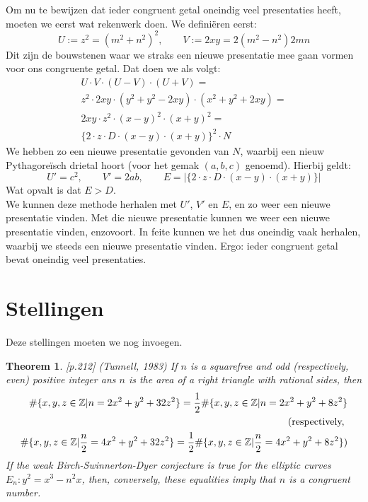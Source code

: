 \documentclass[12pt,reqno]{article}
\newcommand*{\ZZ}{\ensuremath{\mathbb{Z}}}
\begin{document}
	Om nu te bewijzen dat ieder congruent getal oneindig veel presentaties heeft, moeten we eerst wat rekenwerk doen. We defini\"eren eerst:
	\begin{equation}
		U:= z^2=(m^2+n^2)^2, \qquad V:= 2xy=2(m^2-n^2)2mn
	\end{equation}
	Dit zijn de bouwstenen waar we straks een nieuwe presentatie mee gaan vormen voor ons congruente getal. Dat doen we als volgt:
	\begin{align}
			U\cdot V \cdot (U-V) \cdot (U+V)=\\
			z^2\cdot 2xy\cdot (y^2+y^2-2xy)\cdot (x^2+y^2+2xy)=\\
			2xy\cdot z^2\cdot (x-y)^2\cdot (x+y)^2=\\
			\{2\cdot z\cdot D\cdot (x-y)\cdot (x+y)\}^2\cdot N
	\end{align}
	We hebben zo een nieuwe presentatie gevonden van $N$, waarbij een nieuw Pythagore\"isch drietal hoort (voor het gemak $(a,b,c)$ genoemd). Hierbij geldt:
	\begin{equation}
		U'=c^2, \qquad V'=2ab, \qquad E=|\{2\cdot z\cdot D\cdot (x-y)\cdot (x+y)\}|
	\end{equation}
	Wat opvalt is dat $E>D$.\\
	
	We kunnen deze methode herhalen met $U'$, $V'$ en $E$, en zo weer een nieuwe presentatie vinden. Met die nieuwe presentatie kunnen we weer een nieuwe presentatie vinden, enzovoort. In feite kunnen we het dus oneindig vaak herhalen, waarbij we steeds een nieuwe presentatie vinden. Ergo: ieder congruent getal bevat oneindig veel presentaties.
	
	
	\section{Stellingen}
	{\color{red}Deze stellingen moeten we nog invoegen.}
	\newtheorem{Tunnell}{Theorem}
	\begin{Tunnell}
		\cite{Koblitz}[p.212] (Tunnell, 1983) If $n$ is a squarefree and odd (respectively, even) positive integer ans $n$ is the area of a right triangle with rational sides, then
		\begin{align}
		\#\{x,y,z\in\ZZ|n=2x^2+y^2+32z^2\} = \frac{1}{2}\#\{x,y,z\in\ZZ|n=2x^2+y^2+8z^2\}\\
		\notag \text{(respectively, } \\
		\#\{x,y,z\in\ZZ|\frac{n}{2}=4x^2+y^2+32z^2\} = \frac{1}{2}\#\{x,y,z\in\ZZ|\frac{n}{2}=4x^2+y^2+8z^2\})
		\end{align}
		If the weak Birch-Swinnerton-Dyer conjecture is true for the elliptic curves $E_n:y^2=x^3-n^2x$, then, conversely, these equalities imply that $n$ is a congruent number.
	\end{Tunnell}
	
\end{document}
